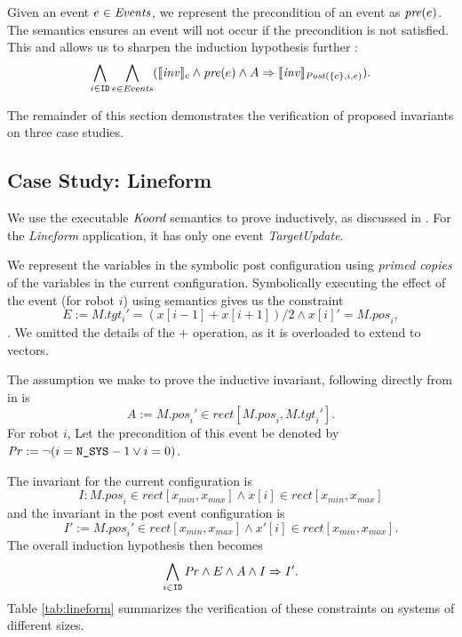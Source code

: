 Given an event $e\in \mathit{Events}$, we represent the precondition of an event as $\mathit{pre}(e)$. The semantics ensures an event will not occur if the precondition is not satisfied. This and  allows us to sharpen the induction hypothesis further :
    $$ \bigwedge_{i\in \texttt{ID}} \bigwedge_{e \in \mathit{Events}}  (\llbracket\mathit{inv}\rrbracket_{c} \wedge \mathit{pre}(e) \wedge A \Rightarrow \llbracket\mathit{inv}\rrbracket_{\mathit{Post}(\left\{c\right\}, i, e) }).$$


The remainder of this section demonstrates the verification of proposed invariants on three case studies.


\subsection{Case Study: Lineform}
 We use the executable $\emph{Koord}$ semantics to prove  inductively, as discussed in . For the \emph{Lineform} application, it has only one event \emph{TargetUpdate}.

We represent the variables in the symbolic post configuration using \emph{primed copies} of the variables in the current configuration. Symbolically executing the effect of the event (for robot $i$) using \K semantics gives us the constraint $$E := \mathit{M.tgt_i}' = (x[i-1] + x[i+1])/2 \wedge x[i]' = \mathit{M.pos}_i,$$. We omitted the details of the $+$ operation, as it is overloaded to extend to vectors.

The assumption we make to prove the inductive invariant, following directly from  in  is $$A := \mathit{M.pos}_i' \in \mathit{rect}[\mathit{M.pos}_i,\mathit{M.tgt}_i'] .$$
For robot $i$, Let the precondition of this event be denoted by $\mathit{Pr}:= \neg (i = \texttt{N\_SYS} - 1 \vee i = 0)$.


The invariant for the current configuration is $$I: \mathit{M.pos}_i \in \mathit{rect}[x_{min}, x_{max}] \wedge x[i] \in \mathit{rect}[x_{min}, x_{max}]$$ and the invariant in the post event configuration is $$I' := \mathit{M.pos}_i' \in \mathit{rect}[x_{min}, x_{max}] \wedge x'[i] \in \mathit{rect}[x_{min}, x_{max}].$$
The overall induction hypothesis then becomes $$ \bigwedge_{i\in \texttt{ID}}\mathit{Pr} \wedge E \wedge A \wedge  I \Rightarrow I'.$$
Table \ref{tab:lineform} summarizes the verification of these constraints on systems of different sizes.

